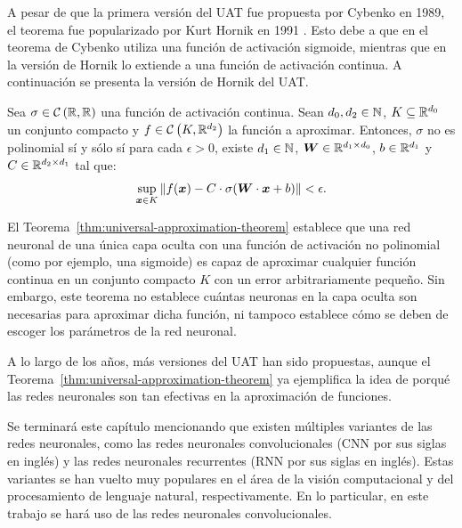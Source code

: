 {{    A pesar de que la primera versión del UAT fue propuesta por Cybenko en 1989, el teorema fue popularizado por Kurt Hornik en 1991 \cite{hornik1991approximation}. Esto debe a que en el teorema de Cybenko utiliza una función de activación sigmoide, mientras que en la versión de Hornik lo extiende a una función de activación continua. A continuación se presenta la versión de Hornik del UAT.
    \begin{theorem}\label{thm:universal-approximation-theorem}
        Sea $\sigma \in \ContSpace[\R, \R]$ una función de activación continua.
        Sean $d_0, d_2 \in \mathbb{N}$, $K \subseteq \mathbb{R}^{d_0}$ un conjunto compacto y $f \in \ContSpace[K, \R^{d_2}]$ la función a aproximar.
        Entonces, $\sigma$ no es polinomial sí y sólo sí para cada $\epsilon > 0$, existe $d_1\in\mathbb{N}$, $\vb*{W} \in \mathbb{R}^{d_1 \times d_0}$, $b \in \mathbb{R}^{d_1}$ y $C \in \mathbb{R}^{d_2 \times d_1}$ tal que:
        \begin{equation}
            \sup_{\vx \in K} \left\| f(\vx) - C \cdot \sigma(\vW \cdot \vx + b) \right\| < \epsilon.
        \end{equation}
    \end{theorem}

    \begin{remark}
        El Teorema~\ref{thm:universal-approximation-theorem} establece que una red neuronal de una única capa oculta con una función de activación no polinomial (como por ejemplo, una sigmoide) es capaz de aproximar cualquier función continua en un conjunto compacto $K$ con un error arbitrariamente pequeño. Sin embargo, este teorema no establece cuántas neuronas en la capa oculta son necesarias para aproximar dicha función, ni tampoco establece cómo se deben de escoger los parámetros de la red neuronal.
    \end{remark}

    A lo largo de los años, más versiones del UAT han sido propuestas, aunque el Teorema~\ref{thm:universal-approximation-theorem} ya ejemplifica la idea de porqué las redes neuronales son tan efectivas en la aproximación de funciones.

    Se terminará este capítulo mencionando que existen múltiples variantes de las redes neuronales, como las redes neuronales convolucionales (CNN por sus siglas en inglés) y las redes neuronales recurrentes (RNN por sus siglas en inglés). Estas variantes se han vuelto muy populares en el área de la visión computacional y del procesamiento de lenguaje natural, respectivamente. En lo particular, en este trabajo se hará uso   de las redes neuronales convolucionales.




}}
